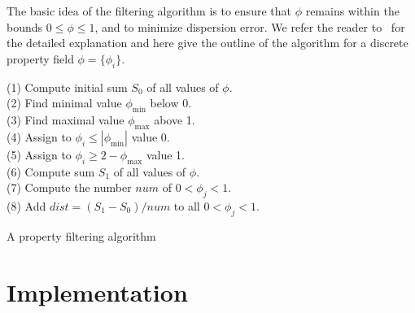 The basic idea of the filtering algorithm is to ensure that
$\phi$ remains within the bounds $0 \leqslant
\phi \leqslant 1$, and to minimize dispersion error.  We refer the
reader to~\citet{LenardicKaula1993} for the detailed explanation and
here give the outline of the algorithm for a discrete property field
$\phi = \{\phi_i \}$.
\begin{algorithm}
  \begin{tabbing}
  (1) Compute initial sum $S_0$ of all values of $\phi$. \\
  (2) Find minimal value $\phi_{\min}$ below 0. \\
  (3) Find maximal value $\phi_{\max}$ above 1. \\
  (4) Assign to $\phi_i \leqslant | \phi_{\min} |$ value 0. \\
  (5) Assign to $\phi_i \geqslant 2 - \phi_{\max} $ value 1. \\
  (6) Compute sum $S_1$ of all values of $\phi$. \\
  (7) Compute the number $num$ of $0 < \phi_j < 1$. \\
  (8) Add $dist = (S_1 - S_0)/num$ to all $ 0 < \phi_j < 1$.
  \end{tabbing}
  \caption{A property filtering algorithm}
  \label{vynnytska:alg:filtering}
\end{algorithm}


\section{Implementation}


